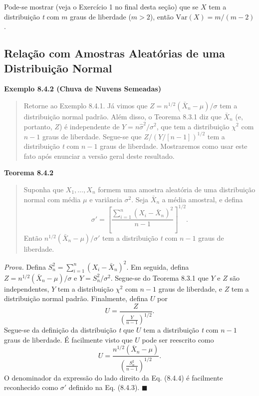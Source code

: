 Pode-se mostrar (veja o Exercício 1 no final desta seção) que se $X$ tem a distribuição \textit{t} com $m$ graus de liberdade ($m > 2$), então $\text{Var}(X) = m/(m-2)$.

\subsection*{Relação com Amostras Aleatórias de uma Distribuição Normal}

\vspace{1em}
\noindent\textbf{Exemplo 8.4.2 (Chuva de Nuvens Semeadas)}
\begin{quote}
    Retorne ao Exemplo 8.4.1. Já vimos que $Z = n^{1/2}(\bar{X}_n - \mu)/\sigma$ tem a distribuição normal padrão. Além disso, o Teorema 8.3.1 diz que $\bar{X}_n$ (e, portanto, $Z$) é independente de $Y = n\hat{\sigma}^2/\sigma^2$, que tem a distribuição $\chi^2$ com $n-1$ graus de liberdade. Segue-se que $Z/(Y/[n-1])^{1/2}$ tem a distribuição \textit{t} com $n-1$ graus de liberdade. Mostraremos como usar este fato após enunciar a versão geral deste resultado.
\end{quote}
\vspace{1em}

\vspace{1em}
\noindent\textbf{Teorema 8.4.2}
\begin{quote}
    Suponha que $X_1, \dots, X_n$ formem uma amostra aleatória de uma distribuição normal com média $\mu$ e variância $\sigma^2$. Seja $\bar{X}_n$ a média amostral, e defina
    \begin{equation} \label{eq:8.4.3}
        \sigma' = \left[\frac{\sum_{i=1}^{n}(X_i - \bar{X}_n)^2}{n-1}\right]^{1/2}.
    \end{equation}
    Então $n^{1/2}(\bar{X}_n - \mu)/\sigma'$ tem a distribuição \textit{t} com $n-1$ graus de liberdade.
\end{quote}
\vspace{1em}

\noindent\textit{Prova.} Defina $S_n^2 = \sum_{i=1}^{n}(X_i - \bar{X}_n)^2$. Em seguida, defina $Z = n^{1/2}(\bar{X}_n - \mu)/\sigma$ e $Y = S_n^2/\sigma^2$. Segue-se do Teorema 8.3.1 que $Y$ e $Z$ são independentes, $Y$ tem a distribuição $\chi^2$ com $n-1$ graus de liberdade, e $Z$ tem a distribuição normal padrão. Finalmente, defina $U$ por
$$
U = \frac{Z}{\left(\frac{Y}{n-1}\right)^{1/2}}.
$$
Segue-se da definição da distribuição \textit{t} que $U$ tem a distribuição \textit{t} com $n-1$ graus de liberdade. É facilmente visto que $U$ pode ser reescrito como
$$
U = \frac{n^{1/2}(\bar{X}_n - \mu)}{\left(\frac{S_n^2}{n-1}\right)^{1/2}}.
$$
O denominador da expressão do lado direito da Eq. (8.4.4) é facilmente reconhecido como $\sigma'$ definido na Eq. (8.4.3). \hfill $\blacksquare$


